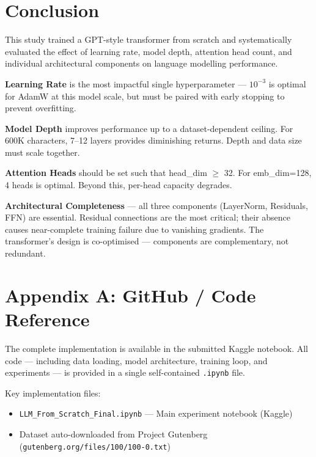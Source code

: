 \documentclass[12pt,a4paper]{article}
\begin{document}
\section{Conclusion}

This study trained a GPT-style transformer from scratch and systematically evaluated the effect of learning rate, model depth, attention head count, and individual architectural components on language modelling performance.

\textbf{Learning Rate} is the most impactful single hyperparameter — $10^{-3}$ is optimal for AdamW at this model scale, but must be paired with early stopping to prevent overfitting.

\textbf{Model Depth} improves performance up to a dataset-dependent ceiling. For 600K characters, 7–12 layers provides diminishing returns. Depth and data size must scale together.

\textbf{Attention Heads} should be set such that head\_dim $\geq$ 32. For emb\_dim=128, 4 heads is optimal. Beyond this, per-head capacity degrades.

\textbf{Architectural Completeness} — all three components (LayerNorm, Residuals, FFN) are essential. Residual connections are the most critical; their absence causes near-complete training failure due to vanishing gradients. The transformer's design is co-optimised — components are complementary, not redundant.

\section*{Appendix A: GitHub / Code Reference}

The complete implementation is available in the submitted Kaggle notebook. All code — including data loading, model architecture, training loop, and experiments — is provided in a single self-contained \texttt{.ipynb} file.

Key implementation files:
\begin{itemize}
  \item \texttt{LLM\_From\_Scratch\_Final.ipynb} — Main experiment notebook (Kaggle)
  \item Dataset auto-downloaded from Project Gutenberg (\texttt{gutenberg.org/files/100/100-0.txt})
\end{itemize}
\end{document}
